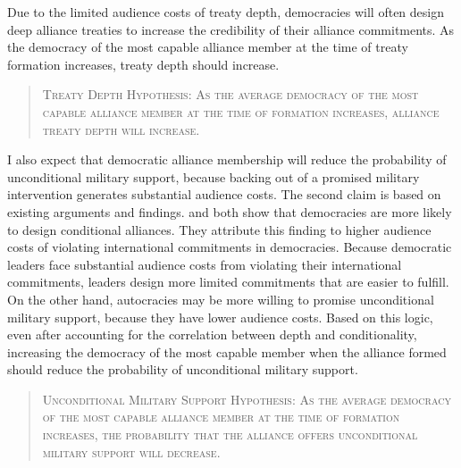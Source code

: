 \documentclass[12pt]{article}
\begin{document}
Due to the limited audience costs of treaty depth, democracies will often design deep alliance treaties to increase the credibility of their alliance commitments. 
As the democracy of the most capable alliance member at the time of treaty formation increases, treaty depth should increase. 


\begin{quote}
\textsc{Treaty Depth Hypothesis: As the average democracy of the most capable alliance member at the time of formation increases, alliance treaty depth will increase.}
\end{quote} 


I also expect that democratic alliance membership will reduce the probability of unconditional military support, because backing out of a promised military intervention generates substantial audience costs. 
The second claim is based on existing arguments and findings. 
\citet{Mattes2012} and \citet{Chibaetal2015} both show that democracies are more likely to design conditional alliances. 
They attribute this finding to higher audience costs of violating international commitments in democracies. 
Because democratic leaders face substantial audience costs from violating their international commitments, leaders design more limited commitments that are easier to fulfill. 
On the other hand, autocracies may be more willing to promise unconditional military support, because they have lower audience costs. 
Based on this logic, even after accounting for the correlation between depth and conditionality, increasing the democracy of the most capable member when the alliance formed should reduce the probability of unconditional military support.


\begin{quote}
\textsc{Unconditional Military Support Hypothesis: As the average democracy of the most capable alliance member at the time of formation increases, the probability that the alliance offers unconditional military support will decrease.}
\end{quote} 
\end{document}

